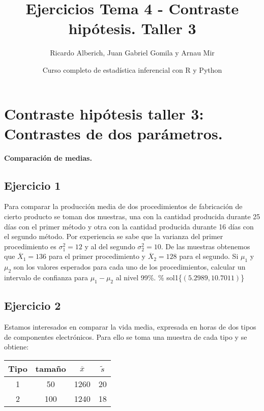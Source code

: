 \documentclass[
]{article}
\title{Ejercicios Tema 4 - Contraste hipótesis. Taller 3}
\author{Ricardo Alberich, Juan Gabriel Gomila y Arnau Mir}
\date{Curso completo de estadística inferencial con R y Python}
\begin{document}
\maketitle

{
\hypersetup{linkcolor=blue}
\setcounter{tocdepth}{2}
\tableofcontents
}
\hypertarget{contraste-hipuxf3tesis-taller-3-contrastes-de-dos-paruxe1metros.}{%
\section{Contraste hipótesis taller 3: Contrastes de dos
parámetros.}\label{contraste-hipuxf3tesis-taller-3-contrastes-de-dos-paruxe1metros.}}

\textbf{Comparación de medias.}

\hypertarget{ejercicio-1}{%
\subsection{Ejercicio 1}\label{ejercicio-1}}

Para comparar la producción media de dos procedimientos de fabricación
de cierto producto se toman dos muestras, una con la cantidad producida
durante 25 días con el primer método y otra con la cantidad producida
durante 16 días con el segundo método. Por experiencia se sabe que la
varianza del primer procedimiento es \(\sigma_{1}^2=12\) y al del
segundo \(\sigma_{2}^2=10\). De las muestras obtenemos que
\(\overline{X}_{1}=136\) para el primer procedimiento y
\(\overline{X}_{2}=128\) para el segundo. Si \(\mu_{1}\) y \(\mu_{2}\)
son los valores esperados para cada uno de los procedimientos, calcular
un intervalo de confianza para \(\mu_{1}-\mu_{2}\) al nivel 99\%. \%
sol1\{\(\left(5.2989,10.7011\right)\)\}

\hypertarget{ejercicio-2}{%
\subsection{Ejercicio 2}\label{ejercicio-2}}

Estamos interesados en comparar la vida media, expresada en horas de dos
tipos de componentes electrónicos. Para ello se toma una muestra de cada
tipo y se obtiene:

\begin{center}
\begin{tabular}{|c|c|c|c|}
\hline Tipo & tamaño & $\overline{x}$ & $\tilde{s}$\\ \hline \hline 1 & 50 & 1260 & 20\\ \hline 2 &
100 & 1240 & 18\\ \hline
\end{tabular}
\end{center}
\end{document}
